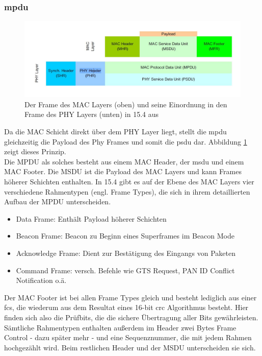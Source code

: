 \subsubsection{\ac{mpdu}}
\begin{figure}
	\centering
	\includegraphics[width=\textwidth]{Grafiken-Alex/mpdu.jpg}
	\caption{Der Frame des MAC Layers (oben) und seine Einordnung in den Frame des PHY Layers (unten) in 15.4 aus \cite{rubinstein}}
	\label{mpdu}
\end{figure}
Da die MAC Schicht direkt über dem PHY Layer liegt, stellt die \acf{mpdu} gleichzeitig die Payload des Phy Frames und somit die \acf{psdu} dar. Abbildung \ref{mpdu} zeigt dieses Prinzip. \\
Die MPDU als solches besteht aus einem MAC Header, der \acf{msdu} und einem MAC Footer. Die MSDU ist die Payload des MAC Layers und kann Frames höherer Schichten enthalten.
In 15.4 gibt es auf der Ebene des MAC Layers vier verschiedene Rahmentypen (engl. Frame Types), die sich in ihrem detaillierten Aufbau der MPDU unterscheiden.
\begin{itemize}
	\item Data Frame: Enthält Payload höherer Schichten
	\item Beacon Frame: Beacon zu Beginn eines Superframes im Beacon Mode
	\item Acknowledge Frame: Dient zur Bestätigung des Eingangs von Paketen
	\item Command Frame: versch. Befehle wie GTS Request, PAN ID Conflict Notification o.ä.
\end{itemize}
Der MAC Footer ist bei allen Frame Types gleich und besteht lediglich aus einer \ac{fcs}, die wiederum aus dem Resultat eines 16-bit \ac{crc} Algorithmus besteht. Hier finden sich also die Prüfbits, die die sichere Übertragung aller Bits gewährleisten.\\
Sämtliche Rahmentypen enthalten außerdem im Header zwei Bytes Frame Control - dazu später mehr - und eine Sequenznummer, die mit jedem Rahmen hochgezählt wird. Beim restlichen Header und der MSDU unterscheiden sie sich. \\

